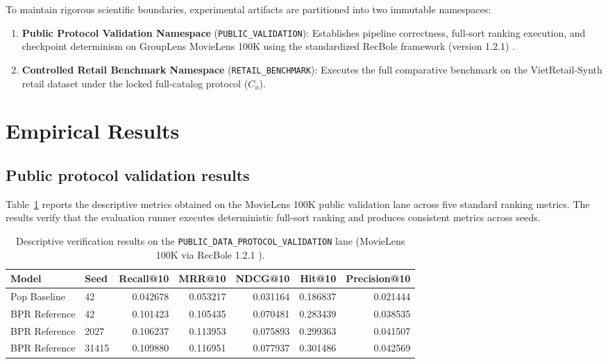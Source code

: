 \documentclass[10pt,a4paper]{article}
\begin{document}
To maintain rigorous scientific boundaries, experimental artifacts are partitioned into two immutable namespaces:
\begin{enumerate}
    \item \textbf{Public Protocol Validation Namespace} (\texttt{PUBLIC\_VALIDATION}): Establishes pipeline correctness, full-sort ranking execution, and checkpoint determinism on GroupLens MovieLens 100K using the standardized RecBole framework (version 1.2.1) \cite{zhao2021_recbole}.
    \item \textbf{Controlled Retail Benchmark Namespace} (\texttt{RETAIL\_BENCHMARK}): Executes the full comparative benchmark on the VietRetail-Synth retail dataset under the locked full-catalog protocol ($C_u$).
\end{enumerate}

\section{Empirical Results}

\subsection{Public protocol validation results}

Table~\ref{tab:public-validation} reports the descriptive metrics obtained on the MovieLens 100K public validation lane across five standard ranking metrics. The results verify that the evaluation runner executes deterministic full-sort ranking and produces consistent metrics across seeds.

\begin{table}[htbp]
\centering
\caption{Descriptive verification results on the \texttt{PUBLIC\_DATA\_PROTOCOL\_VALIDATION} lane (MovieLens 100K via RecBole 1.2.1 \cite{zhao2021_recbole}).}
\label{tab:public-validation}
\small
\begin{tabular}{llrrrrr}
\toprule
Model & Seed & Recall@10 & MRR@10 & NDCG@10 & Hit@10 & Precision@10 \\
\midrule
Pop Baseline & 42 & 0.042678 & 0.053217 & 0.031164 & 0.186837 & 0.021444 \\
BPR Reference & 42 & 0.101423 & 0.105435 & 0.070481 & 0.283439 & 0.038535 \\
BPR Reference & 2027 & 0.106237 & 0.113953 & 0.075893 & 0.299363 & 0.041507 \\
BPR Reference & 31415 & 0.109880 & 0.116951 & 0.077937 & 0.301486 & 0.042569 \\
\bottomrule
\end{tabular}
\end{table}
\end{document}
